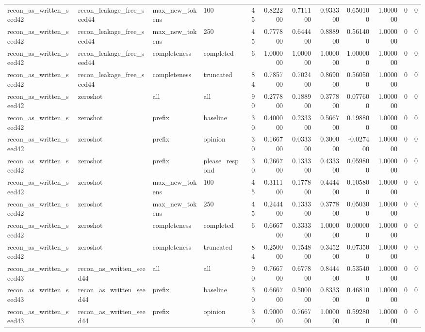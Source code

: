 \begin{tabular}{llllrrrrrrrr}
recon_as_written_seed42 & recon_leakage_free_seed44 & max_new_tokens & 100 & 45 & 0.822200 & 0.711100 & 0.933300 & 0.650100 & 1.000000 & 0 & 0 \\
recon_as_written_seed42 & recon_leakage_free_seed44 & max_new_tokens & 250 & 45 & 0.777800 & 0.644400 & 0.888900 & 0.561400 & 1.000000 & 0 & 0 \\
recon_as_written_seed42 & recon_leakage_free_seed44 & completeness & completed & 6 & 1.000000 & 1.000000 & 1.000000 & 1.000000 & 1.000000 & 0 & 0 \\
recon_as_written_seed42 & recon_leakage_free_seed44 & completeness & truncated & 84 & 0.785700 & 0.702400 & 0.869000 & 0.560500 & 1.000000 & 0 & 0 \\
recon_as_written_seed42 & zeroshot & all & all & 90 & 0.277800 & 0.188900 & 0.377800 & 0.077600 & 1.000000 & 0 & 0 \\
recon_as_written_seed42 & zeroshot & prefix & baseline & 30 & 0.400000 & 0.233300 & 0.566700 & 0.198800 & 1.000000 & 0 & 0 \\
recon_as_written_seed42 & zeroshot & prefix & opinion & 30 & 0.166700 & 0.033300 & 0.300000 & -0.027400 & 1.000000 & 0 & 0 \\
recon_as_written_seed42 & zeroshot & prefix & please_respond & 30 & 0.266700 & 0.133300 & 0.433300 & 0.059800 & 1.000000 & 0 & 0 \\
recon_as_written_seed42 & zeroshot & max_new_tokens & 100 & 45 & 0.311100 & 0.177800 & 0.444400 & 0.105800 & 1.000000 & 0 & 0 \\
recon_as_written_seed42 & zeroshot & max_new_tokens & 250 & 45 & 0.244400 & 0.133300 & 0.377800 & 0.050300 & 1.000000 & 0 & 0 \\
recon_as_written_seed42 & zeroshot & completeness & completed & 6 & 0.666700 & 0.333300 & 1.000000 & 0.000000 & 1.000000 & 0 & 0 \\
recon_as_written_seed42 & zeroshot & completeness & truncated & 84 & 0.250000 & 0.154800 & 0.345200 & 0.073500 & 1.000000 & 0 & 0 \\
recon_as_written_seed43 & recon_as_written_seed44 & all & all & 90 & 0.766700 & 0.677800 & 0.844400 & 0.535400 & 1.000000 & 0 & 0 \\
recon_as_written_seed43 & recon_as_written_seed44 & prefix & baseline & 30 & 0.666700 & 0.500000 & 0.833300 & 0.468100 & 1.000000 & 0 & 0 \\
recon_as_written_seed43 & recon_as_written_seed44 & prefix & opinion & 30 & 0.900000 & 0.766700 & 1.000000 & 0.592800 & 1.000000 & 0 & 0 \\

\end{tabular}
